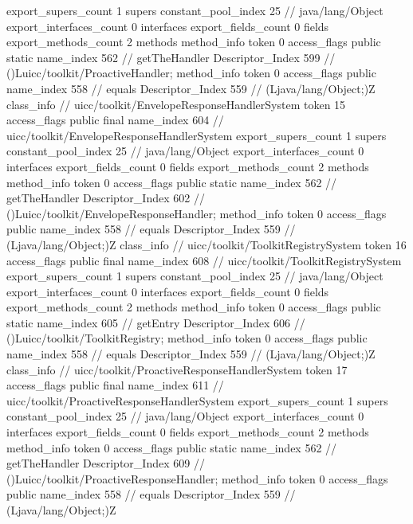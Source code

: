 {{{			export_supers_count	1
			supers {
				constant_pool_index	25		// java/lang/Object
			}
			export_interfaces_count	0
			interfaces {
			}
			export_fields_count	0
			fields {
			}
			export_methods_count	2
			methods {
				method_info {
					token	0
					access_flags	public static
					name_index	562		// getTheHandler
					Descriptor_Index	599		// ()Luicc/toolkit/ProactiveHandler;
				}
				method_info {
					token	0
					access_flags	public
					name_index	558		// equals
					Descriptor_Index	559		// (Ljava/lang/Object;)Z
				}
			}
		}
		class_info {		// uicc/toolkit/EnvelopeResponseHandlerSystem
			token	15
			access_flags	public final
			name_index	604		// uicc/toolkit/EnvelopeResponseHandlerSystem
			export_supers_count	1
			supers {
				constant_pool_index	25		// java/lang/Object
			}
			export_interfaces_count	0
			interfaces {
			}
			export_fields_count	0
			fields {
			}
			export_methods_count	2
			methods {
				method_info {
					token	0
					access_flags	public static
					name_index	562		// getTheHandler
					Descriptor_Index	602		// ()Luicc/toolkit/EnvelopeResponseHandler;
				}
				method_info {
					token	0
					access_flags	public
					name_index	558		// equals
					Descriptor_Index	559		// (Ljava/lang/Object;)Z
				}
			}
		}
		class_info {		// uicc/toolkit/ToolkitRegistrySystem
			token	16
			access_flags	public final
			name_index	608		// uicc/toolkit/ToolkitRegistrySystem
			export_supers_count	1
			supers {
				constant_pool_index	25		// java/lang/Object
			}
			export_interfaces_count	0
			interfaces {
			}
			export_fields_count	0
			fields {
			}
			export_methods_count	2
			methods {
				method_info {
					token	0
					access_flags	public static
					name_index	605		// getEntry
					Descriptor_Index	606		// ()Luicc/toolkit/ToolkitRegistry;
				}
				method_info {
					token	0
					access_flags	public
					name_index	558		// equals
					Descriptor_Index	559		// (Ljava/lang/Object;)Z
				}
			}
		}
		class_info {		// uicc/toolkit/ProactiveResponseHandlerSystem
			token	17
			access_flags	public final
			name_index	611		// uicc/toolkit/ProactiveResponseHandlerSystem
			export_supers_count	1
			supers {
				constant_pool_index	25		// java/lang/Object
			}
			export_interfaces_count	0
			interfaces {
			}
			export_fields_count	0
			fields {
			}
			export_methods_count	2
			methods {
				method_info {
					token	0
					access_flags	public static
					name_index	562		// getTheHandler
					Descriptor_Index	609		// ()Luicc/toolkit/ProactiveResponseHandler;
				}
				method_info {
					token	0
					access_flags	public
					name_index	558		// equals
					Descriptor_Index	559		// (Ljava/lang/Object;)Z
				}
			}
		}
	}
}
